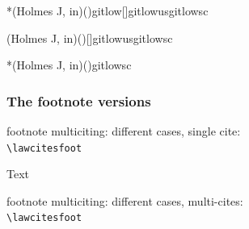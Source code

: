 \begin{filecontents}{\democodefile}
*\noindent\lawcitesinlinerr(Holmes J, in)(){gitlow}[]{gitlowus}{gitlowsc}

\noindent\lawcitesinlinerr(Holmes J, in)()[]{gitlowus}{gitlowsc}

*\noindent\lawcitesinlinerr(Holmes J, in)(){gitlowsc}
\end{filecontents}
\PrintCodeAndResultsStackedR
\spotsep


\subsubsection{The footnote versions}



\noindent
\theball
footnote multiciting: different cases, single cite: \\
\verb|\lawcitesfoot|
\bigskip

\begin{filecontents}{\democodefile}
Text
\end{filecontents}
\PrintCodeAndResultsStackedR

\spotsep


\noindent
\theball
footnote multiciting: different cases, multi-cites: \\
\verb|\lawcitesfoot|
\bigskip


